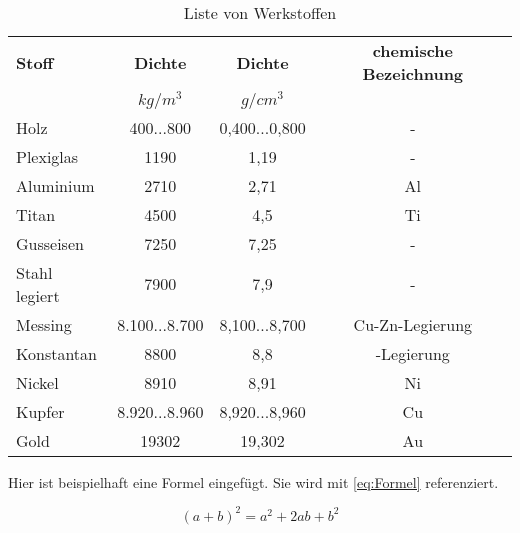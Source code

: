 \begin{table}[htb]
    \begin{tabular}{lccc}\toprule                   %
    \textbf{Stoff}	&\textbf{Dichte} &\textbf{Dichte} &\textbf{chemische Bezeichnung}	\\
                & \(kg/m^{3}\)	& \(g/cm^3\) 	& \\\midrule         %
    Holz		& 400...800	& 0,400...0,800	&- \\
    Plexiglas 	& 1190	& 1,19	& - 	\\
    Aluminium	& 2710	& 2,71	& Al	\\
    Titan		& 4500	& 4,5	& Ti	\\
    Gusseisen	& 7250	& 7,25	& - \\
    Stahl legiert& 7900	& 7,9	& - \\
    Messing		& 8.100...8.700	& 8,100...8,700	& Cu-Zn-Legierung\\
    Konstantan	& 8800	& 8,8	& \ch{Cu55Ni45}-Legierung\\
    Nickel		& 8910	& 8,91  & Ni \\
    Kupfer		& 8.920...8.960	& 8,920...8,960	& Cu\\
    Gold		& 19302	& 19,302& Au	\\\bottomrule               %
    \end{tabular}
    \caption{Liste von Werkstoffen}
    \label{tab:liste_der_werkstoffe}
\end{table}

\newpage

Hier ist beispielhaft eine Formel eingefügt. Sie wird mit \autoref{eq:Formel} referenziert.

\begin{equation}\label{eq:Formel}
    {(a+b)^2 = a^2 + 2ab+b^2}
\end{equation}
